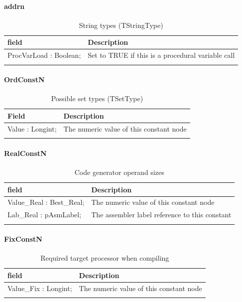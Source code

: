 \documentclass [a4paper,12pt]{article}
\begin{document}
\paragraph{addrn}\mbox{}

\begin{longtable}{|l|p{10cm}|}
\hline
field	& Description \\
\hline
\endhead
\hline
\endfoot
\textsf{ProcVarLoad : Boolean;}&
	Set to TRUE if this is a procedural variable call \\
\hline
\caption{String types (TStringType)}
\end{longtable}

\paragraph{OrdConstN}\mbox{}

\begin{longtable}{|l|p{10cm}|}
\hline
Field	& Description \\
\hline
\endhead
\hline
\endfoot
\textsf{Value : Longint;}&
	The numeric value of this constant node \\
\hline
\caption{Possible set types (TSetType)}
\end{longtable}

\paragraph{RealConstN}\mbox{}

\begin{longtable}{|l|p{10cm}|}
\hline
field	& Description \\
\hline
\endhead
\hline
\endfoot
\textsf{Value{\_}Real : Best{\_}Real;}&
	The numeric value of this constant node \\
\textsf{Lab{\_}Real : pAsmLabel;}&
	The assembler label reference to this constant \\
\hline
\caption{Code generator operand sizes}\label{tab16}
\end{longtable}

\paragraph{FixConstN}\mbox{}

\begin{longtable}{|l|p{10cm}|}
\hline
field	& Description \\
\hline
\endhead
\hline
\endfoot
\textsf{Value{\_}Fix : Longint;}&
	The numeric value of this constant node \\
\hline
\caption{Required target processor when compiling}
\label{tab17}
\end{longtable}
\end{document}
